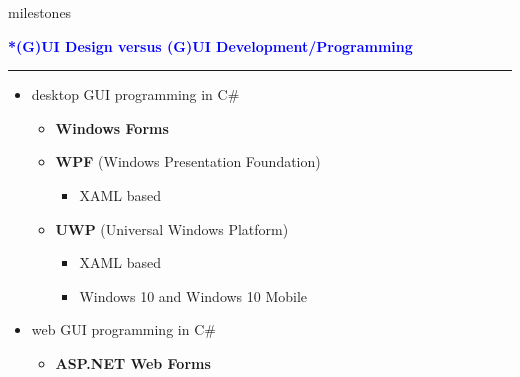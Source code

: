 \documentclass[pdf]{beamer}
\begin{document}
{{{{{{{{\begin{frame}
\begin{itemize}
milestones
	\end{itemize}
    \bigskip
    \bigskip
    \bigskip
    \bigskip
    \bigskip
    \bigskip
    
\end{frame}}



{
\begin{frame}
	\vspace{8mm}
	\textcolor{Blue}{\textbf{\Large{*(G)UI Design versus (G)UI Development/Programming}}}
    \textcolor{red}{\rule{10cm}{1mm}}

\begin{itemize}
\item desktop GUI programming in C\#
\begin{itemize}
\item \textbf{Windows Forms}
\newline

\item \textbf{WPF} (Windows Presentation Foundation)
\begin{itemize}
\item  XAML based
\end{itemize}

\item \textbf{UWP} (Universal Windows Platform)
\begin{itemize}
\item  XAML based
\item  Windows 10 and Windows 10 Mobile
\end{itemize}
\end{itemize}

\item web GUI programming in C\#
\begin{itemize}
\item \textbf{ASP.NET Web Forms}
\newline


\end{itemize}
\end{itemize}
\end{frame}}}}}}}}}
\end{document}
